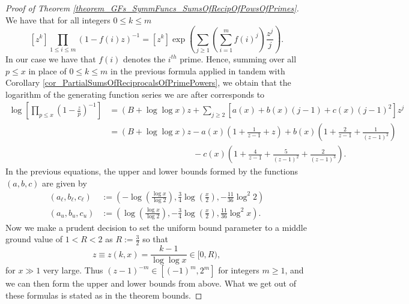 \documentclass[11pt,reqno,a4letter]{article}
\numberwithin{figure}{section}
\numberwithin{table}{section}
\theoremstyle{plain}
\numberwithin{theorem}{section}
\theoremstyle{definition}
\begin{document}
\begin{proof}[Proof of Theorem \ref{theorem_GFs_SymmFuncs_SumsOfRecipOfPowsOfPrimes}] 
We have that for all integers $0 \leq k \leq m$
\[
[z^k] \prod_{1 \leq i \leq m} (1-f(i) z)^{-1} = [z^k] \exp\left(\sum_{j \geq 1} 
     \left(\sum_{i=1}^m f(i)^j\right) \frac{z^j}{j}\right). 
\]
In our case we have that $f(i)$ denotes the $i^{th}$ prime. Hence, summing over all $p \leq x$ 
in place of $0 \leq k \leq m$ in the previous formula applied in tandem with 
Corollary \ref{cor_PartialSumsOfReciprocalsOfPrimePowers}, we obtain that the logarithm of the 
generating function series we are after corresponds to 
\begin{align*} 
\log\left[\prod_{p \leq x} \left(1-\frac{z}{p}\right)^{-1}\right] & = (B + \log\log x) z + 
     \sum_{j \geq 2} \left[a(x) + b(x)(j-1) + c(x) (j-1)^2\right] z^j \\ 
     & = (B + \log\log x) z - a(x) \left(1 + \frac{1}{z-1} + z\right) + b(x) \left( 
     1 + \frac{2}{z-1} + \frac{1}{(z-1)^2}\right) \\ 
     & \phantom{= (B + \log\log x) z\ } - 
     c(x) \left( 
     1 + \frac{4}{z-1} + \frac{5}{(z-1)^2} + \frac{2}{(z-1)^3}\right). 
\end{align*} 
In the previous equations, the upper and lower bounds formed by the functions $(a,b,c)$ are 
given by 
\begin{align*} 
(a_{\ell}, b_{\ell}, c_{\ell}) & := \left(-\log\left(\frac{\log x}{\log 2}\right), 
     \frac{3}{4} \log\left(\frac{x}{2}\right), - \frac{11}{36} \log^2 2\right) \\ 
(a_u, b_u, c_u) & := \left(\log\left(\frac{\log x}{\log 2}\right), 
     -\frac{3}{4} \log\left(\frac{x}{2}\right), \frac{11}{36} \log^2 x\right). 
\end{align*} 
Now we make a prudent decision to set the uniform bound parameter to a middle ground value of 
$1 < R < 2$ as $R := \frac{3}{2}$ so that 
$$z \equiv z(k, x) = \frac{k-1}{\log\log x} \in [0, R),$$ for $x \gg 1$ very large. 
Thus $(z-1)^{-m} \in [(-1)^m, 2^m]$ for integers $m \geq 1$, and we can then form the upper and 
lower bounds from above. What we get out of these formulas is stated as in the theorem bounds. 
\end{proof} 
\end{document}
